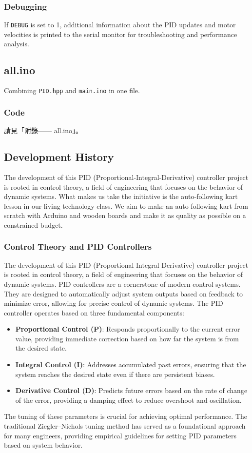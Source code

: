 \documentclass[a4paper,12pt]{./article}
\begin{document}
\subsubsection{Debugging}
If \texttt{DEBUG} is set to 1, additional information about the PID updates and motor velocities is printed to the serial monitor for troubleshooting and performance analysis.
\subsection{all.ino}
Combining \texttt{PID.hpp} and \texttt{main.ino} in one file.
\subsubsection{Code}
請見「附錄—— all.ino」。
\subsection{Development History}
The development of this PID (Proportional-Integral-Derivative) controller project is rooted in control theory, a field of engineering that focuses on the behavior of dynamic systems. What makes us take the initiative is the auto-following kart lesson in our living technology class. We aim to make an auto-following kart from scratch with Arduino and wooden boards and make it as quality as possible on a constrained budget.
\subsubsection{Control Theory and PID Controllers}
The development of this PID (Proportional-Integral-Derivative) controller project is rooted in control theory, a field of engineering that focuses on the behavior of dynamic systems. PID controllers are a cornerstone of modern control systems. They are designed to automatically adjust system outputs based on feedback to minimize error, allowing for precise control of dynamic systems. The PID controller operates based on three fundamental components:
\begin{itemize}
\item \textbf{Proportional Control (P)}: Responds proportionally to the current error value, providing immediate correction based on how far the system is from the desired state.
\item \textbf{Integral Control (I)}: Addresses accumulated past errors, ensuring that the system reaches the desired state even if there are persistent biases.
\item \textbf{Derivative Control (D)}: Predicts future errors based on the rate of change of the error, providing a damping effect to reduce overshoot and oscillation.
\end{itemize}
The tuning of these parameters is crucial for achieving optimal performance. The traditional Ziegler–Nichols tuning method has served as a foundational approach for many engineers, providing empirical guidelines for setting PID parameters based on system behavior.
\end{document}
